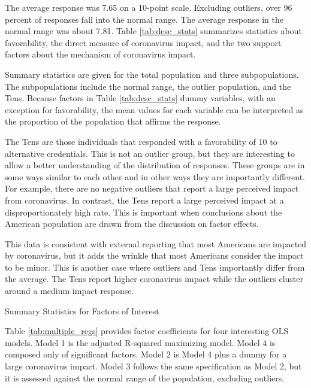\documentclass[review]{elsarticle}
\begin{document}
The average response was 7.65 on a 10-point scale.
Excluding outliers, over 96 percent of responses fall into the normal range.
The average response in the normal range was about 7.81.
Table \ref{tab:desc_stats} summarizes statistics about favorability,
the direct measure of coronavirus impact,
and the two support factors about the mechanism of coronavirus impact.

Summary statistics are given for the total population and three subpopulations.
The subpopulations include the normal range, the outlier population, and the Tens.
Because factors in Table \ref{tab:desc_stats} dummy variables,
with an exception for favorability,
the mean values for each variable can be interpreted as the proportion of the population
that affirms the response.

The Tens are those individuals that responded with a favorability of 10 to alternative credentials.
This is not an outlier group, but they are interesting to allow a better understanding of the distribution of responses.
These groups are in some ways similar to each other and in other ways they are importantly different.
For example, there are no negative outliers that report a large perceived impact from coronavirus.
In contrast, the Tens report a large perceived impact at a disproportionately high rate.
This is important when conclusions about the American population are drawn from the discussion on factor effects.

This data is consistent with external reporting that most Americans are impacted by coronavirus\cite{demographic2020},
but it adds the wrinkle that most Americans consider the impact to be minor.
This is another case where outliers and Tens importantly differ from the average.
The Tens report higher coronavirus impact while the outliers cluster around a medium impact response.

\begin{table}
    \caption{Summary Statistics for Factors of Interest}
    \resizebox{\columnwidth}{!}{
        
    }
    \label{tab:desc_stats}
\end{table}

Table \ref{tab:multiple_regs} provides factor coefficients for four interesting OLS models.
Model 1 is the adjusted R-squared maximizing model.
Model 4 is composed only of significant factors.
Model 2 is Model 4 plus a dummy for a large coronavirus impact.
Model 3 follows the same specification as Model 2,
but it is assessed against the normal range of the population, excluding outliers.
\end{document}
